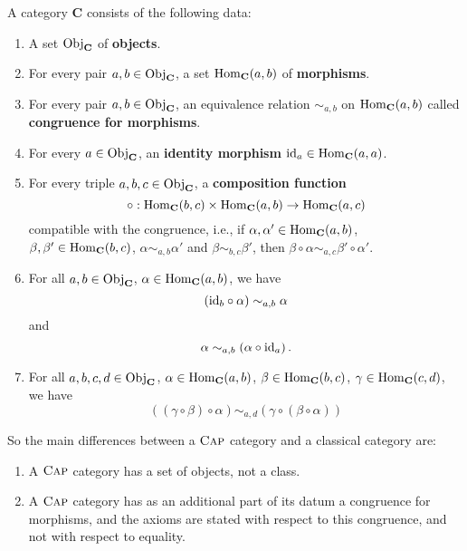 \begin{definition}\label{definition:CapCategory}
 A \CapPkg category $\mathbf{C}$ consists of the following data:
 \begin{enumerate}
  \item A set $\mathrm{Obj}_{\mathbf{C}}$ of \textbf{objects}.
  \item For every pair $a,b \in \mathrm{Obj}_{\mathbf{C}}$, a set $\operatorname{\mathrm{Hom}}_{\mathbf{C}}( a, b )$ of \textbf{morphisms}.
  \item For every pair $a,b \in \mathrm{Obj}_{\mathbf{C}}$, an equivalence relation $\sim_{a,b}$ on $\operatorname{\mathrm{Hom}}_{\mathbf{C}}( a, b )$
  called \textbf{congruence for morphisms}.
  \item For every $a \in \mathrm{Obj}_{\mathbf{C}}$, an \textbf{identity morphism} $\mathrm{id}_a \in \operatorname{\mathrm{Hom}}_{\mathbf{C}}( a, a )$.
  \item For every triple $a, b, c \in \mathrm{Obj}_{\mathbf{C}}$, a \textbf{composition function}
  \[
   \circ: \operatorname{\mathrm{Hom}}_{\mathbf{C}}( b, c ) \times \operatorname{\mathrm{Hom}}_{\mathbf{C}}( a, b ) \rightarrow \operatorname{\mathrm{Hom}}_{\mathbf{C}}( a, c )
  \]
  compatible with the congruence, i.e., 
  if $\alpha, \alpha' \in \operatorname{\mathrm{Hom}}_{\mathbf{C}}( a, b )$, 
  $\beta, \beta' \in \operatorname{\mathrm{Hom}}_{\mathbf{C}}( b, c )$,
  $\alpha \sim_{a,b} \alpha'$ 
  and $\beta \sim_{b,c} \beta'$, 
  then $\beta \circ \alpha \sim_{a,c} \beta' \circ \alpha'$.
  \item For all $a, b \in \mathrm{Obj}_{\mathbf{C}}$, 
        $\alpha \in \operatorname{\mathrm{Hom}}_{\mathbf{C}}( a, b )$, 
        we have 
        \[
        \left( \mathrm{id}_{b} \circ \alpha \right) \sim_{a,b} \alpha
        \]
        and
        \[
        \alpha \sim_{a,b} \left( \alpha \circ \mathrm{id}_{a} \right).
        \]
  \item For all $a,b,c,d \in \mathrm{Obj}_{\mathbf{C}}$, 
        $\alpha \in \operatorname{\mathrm{Hom}}_{\mathbf{C}}( a, b )$, 
        $\beta \in \operatorname{\mathrm{Hom}}_{\mathbf{C}}( b, c )$, 
        $\gamma \in \operatorname{\mathrm{Hom}}_{\mathbf{C}}( c, d )$,
        we have
        \[
        \left(( \gamma \circ \beta ) \circ \alpha \right) \sim_{a,d} \left( \gamma \circ ( \beta \circ \alpha ) \right)
        \]
 \end{enumerate}
\end{definition}

So the main differences between a $\textsc{Cap}$ category and a classical category are:
\begin{enumerate}
 \item A $\textsc{Cap}$ category has a set of objects, not a class.
 \item A $\textsc{Cap}$ category has as an additional part of its datum a congruence for morphisms, and the
 axioms are stated with respect to this congruence, and not with respect to equality.
\end{enumerate}

